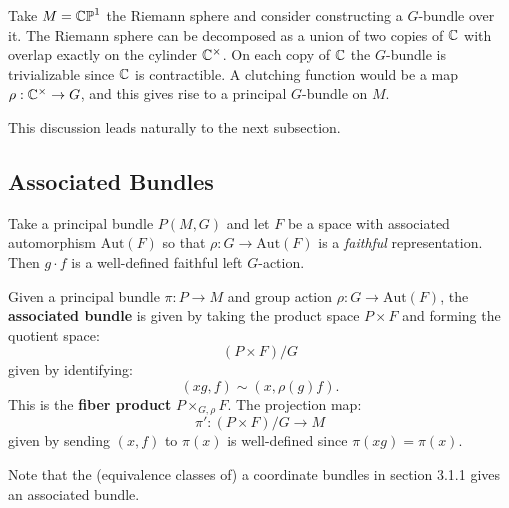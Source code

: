 		\begin{eg}
			Take $M = \mathbb{CP}^1$ the Riemann sphere and consider constructing a $G$-bundle over it. The Riemann sphere can be decomposed as a union of two copies of $\mathbb{C}$ with overlap exactly on the cylinder $\mathbb{C}^{\times}$. On each copy of $\mathbb{C}$ the $G$-bundle is trivializable since $\mathbb{C}$ is contractible. A clutching function would be a map $\rho: \mathbb{C}^\times \to G$, and this gives rise to a principal $G$-bundle on $M$. 
		\end{eg}
		
		This discussion leads naturally to the next subsection. 
		
		
		\subsection{Associated Bundles}
		Take a principal bundle $P(M,G)$ and let $F$ be a space with associated automorphism $\mathrm{Aut}(F)$ so that $\rho: G \to \mathrm{Aut}(F)$ is a \emph{faithful} representation. Then $g \cdot f$ is a well-defined faithful left $G$-action.
		\begin{defn}
			Given a principal bundle $\pi: P \to M$ and group action $\rho: G \to \mathrm{Aut}(F)$, the \textbf{associated bundle} is given by taking the product space $P \times F$ and forming the quotient space:
			\[
				(P \times F) / G
			\]
			given by identifying:
			\[
				(x g, f) \sim (x, \rho(g) f).
			\]
			This is the \textbf{fiber product} $P \times_{G, \rho} F$. The projection map:
			\[
				\pi': (P \times F) / G \to M
			\]
			given by sending $(x, f)$ to $\pi(x)$ is well-defined since $\pi(x g) = \pi(x)$.
		\end{defn}
		Note that the (equivalence classes of) a coordinate bundles in section 3.1.1 gives an associated bundle.
		
